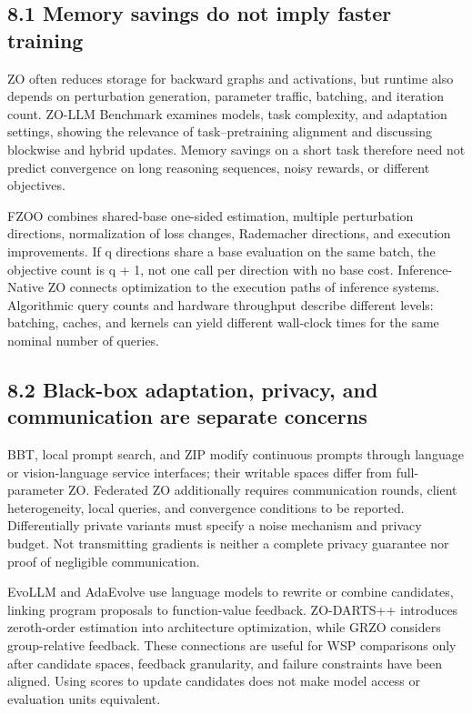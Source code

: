 \subsection*{8.1 Memory savings do not imply faster training}

ZO often reduces storage for backward graphs and activations, but runtime also depends on perturbation generation, parameter traffic, batching, and iteration count. ZO-LLM Benchmark examines models, task complexity, and adaptation settings, showing the relevance of task–pretraining alignment and discussing blockwise and hybrid updates.\cite{r61} Memory savings on a short task therefore need not predict convergence on long reasoning sequences, noisy rewards, or different objectives.


FZOO combines shared-base one-sided estimation, multiple perturbation directions, normalization of loss changes, Rademacher directions, and execution improvements.\cite{r78} If q directions share a base evaluation on the same batch, the objective count is q + 1, not one call per direction with no base cost. Inference-Native ZO connects optimization to the execution paths of inference systems.\cite{r81} Algorithmic query counts and hardware throughput describe different levels: batching, caches, and kernels can yield different wall-clock times for the same nominal number of queries.


\subsection*{8.2 Black-box adaptation, privacy, and communication are separate concerns}

BBT, local prompt search, and ZIP modify continuous prompts through language or vision-language service interfaces; their writable spaces differ from full-parameter ZO.\cite{r58,r64,r76} Federated ZO additionally requires communication rounds, client heterogeneity, local queries, and convergence conditions to be reported.\cite{r59,r60} Differentially private variants must specify a noise mechanism and privacy budget.\cite{r72} Not transmitting gradients is neither a complete privacy guarantee nor proof of negligible communication.


EvoLLM and AdaEvolve use language models to rewrite or combine candidates, linking program proposals to function-value feedback.\cite{r63,r80} ZO-DARTS++ introduces zeroth-order estimation into architecture optimization, while GRZO considers group-relative feedback.\cite{r75,r82} These connections are useful for WSP comparisons only after candidate spaces, feedback granularity, and failure constraints have been aligned. Using scores to update candidates does not make model access or evaluation units equivalent.


